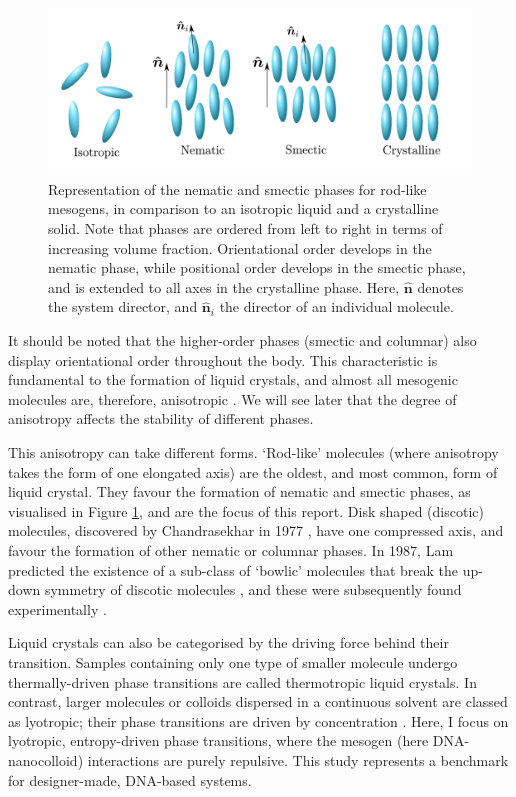 \documentclass[11pt, a4paper]{article} %
\begin{document}
\begin{figure} [!ht]
	\centering
	\includegraphics[width=0.9\linewidth]{Figures/lc_phases_self1.png}
	\caption{Representation of the nematic and smectic phases for rod-like mesogens, in comparison to an isotropic liquid and a crystalline solid. Note that phases are ordered from left to right in terms of increasing volume fraction. Orientational order develops in the nematic phase, while positional order develops in the smectic phase, and is extended to all axes in the crystalline phase. Here, $\boldsymbol{\hat{n}}$ denotes the system director, and $\boldsymbol{\hat{n}}_{i}$ the director of an individual molecule. }
	\label{fig:lcphasescropped}
\end{figure}


It should be noted that the higher-order phases (smectic and columnar) also display orientational order throughout the body. This characteristic is fundamental to the formation of liquid crystals, and almost all mesogenic molecules are, therefore, anisotropic \cite{Kato2007}. We will see later that the degree of anisotropy affects the stability of different phases. 

This anisotropy can take different forms. `Rod-like' molecules (where anisotropy takes the form of one elongated axis) are the oldest, and most common, form of liquid crystal. They favour the formation of nematic and smectic phases, as visualised in Figure \ref{fig:lcphasescropped}, and are the focus of this report. Disk shaped (discotic) molecules, discovered by Chandrasekhar in 1977 \cite{Chandrasekhar1977}, have one compressed axis, and favour the formation of other nematic or columnar phases. In 1987, Lam predicted the existence of a sub-class of `bowlic' molecules that break the up-down symmetry of discotic molecules \cite{LinLei1988}, and these were subsequently found experimentally \cite{Zimmermann1985, Malthete1985}.

Liquid crystals can also be categorised by the driving force behind their transition. Samples containing only one type of smaller molecule undergo thermally-driven phase transitions are called thermotropic liquid crystals. In contrast, larger molecules or colloids dispersed in a continuous solvent are classed as lyotropic; their phase transitions are driven by concentration \cite{DeGennes1993}. Here, I focus on lyotropic, entropy-driven phase transitions, where the mesogen (here DNA-nanocolloid) interactions are purely repulsive. This study represents a benchmark for designer-made, DNA-based systems.
\end{document}

